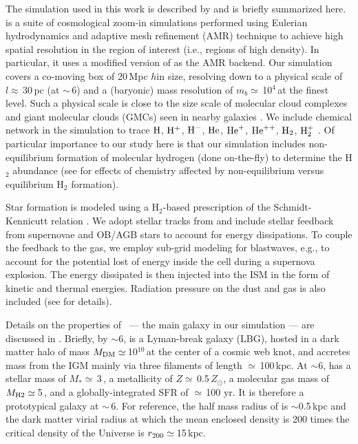 \IfFileExists{emulateapjlegacy.cls}{\documentclass[iop]{emulateapjlegacy}}{\documentclass[iop]{emulateapj}}
\begin{document}
The simulation used in this work is described by \citealt{Pallottini17a, Pallottini17b} and is briefly summarized here.
%
 is a suite of cosmological zoom-in simulations performed using Eulerian hydrodynamics and adaptive mesh refinement (AMR) technique to achieve high spatial resolution in the region of interest (i.e., regions of high density).
%
In particular, it uses a modified version of  \citep{Teyssier02a} as the AMR backend. Our simulation covers a co-moving box of 20\,Mpc $h$\pmOne in size, resolving down to a physical scale of $l\approx$\,30\,pc (at \z$\sim$\,6) and a (baryonic) mass resolution of $m_b\simeq$\,10$^4$\,\Msun at the finest level. Such a physical scale is close to the size scale of molecular cloud complexes and giant molecular clouds (GMCs) seen in nearby galaxies \citep[e.g.,][]{Sanders85a, Federrath13a, Goodman14a}.
%
We include chemical network in the simulation to trace $\rm{H}$, $\rm{H}^{+}$, $\rm{H}^{-}$, $\rm{He}$, $\rm{He}^{+}$, $\rm{He}^{++}$, $\rm{H}_2$, $\rm{H}_2^{+}$ \citep{Grassi14a,Bovino16a}. Of particular importance to our study here is that our simulation includes non-equilibrium formation of molecular hydrogen (done on-the-fly) to determine the H$_2$ abundance (see \citealt{Pallottini17b} for effects of chemistry affected by non-equilibrium versus equilibrium H$_2$ formation).

Star formation is modeled using a H$_2$-based prescription of the Schmidt-Kennicutt relation \citep{Krumholz09a}. We adopt stellar tracks from  and include stellar feedback from supernovae and OB/AGB stars to account for energy dissipations. To couple the feedback to the gas, we employ sub-grid modeling for blastwaves, e.g., to account for the potential lost of energy inside the cell during a supernova explosion. The energy dissipated is then injected into the ISM in the form of kinetic and thermal energies. Radiation pressure on the dust and gas is also included (see \citealt{Pallottini17a} for details).

Details on the properties of \flower\ --- the main galaxy in our simulation --- are discussed in \citet{Pallottini17b}. Briefly, by \z$\sim$6, \flower is a Lyman-break galaxy (LBG), hosted in a dark matter halo of mass $M_{\rm DM}\simeq$\,10$^{10}$\,\Msun at the center of a cosmic web knot, and accretes mass from the IGM mainly via three filaments of length $\simeq$\,100\,kpc. At \z$\sim$6, \flower has a stellar mass of $M_*\simeq$\,3\,\Msun, a metallicity of $Z\simeq$\,0.5\,$Z_{\odot}$, a molecular gas mass of $M_{\rm H2}\simeq$\,5\,\Msun, and a globally-integrated SFR of $\simeq$\,100\,\Msun\,yr\pmOne. It is therefore a prototypical galaxy at \z$\sim$\,6.
For reference, the half mass radius of \flower is $\sim$0.5\,kpc and the dark matter virial radius at which the mean enclosed density is 200 times the critical density of the Universe is $r_{\rm 200}\simeq$\,15\,kpc.
\end{document}

